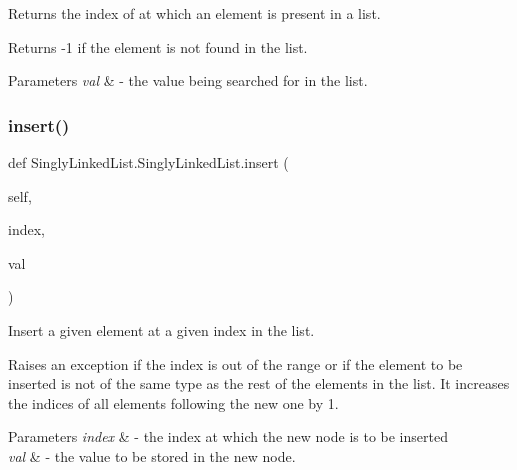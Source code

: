 Returns the index of at which an element is present in a list. 

Returns -\/1 if the element is not found in the list.


\begin{DoxyParams}{Parameters}
{\em val} & -\/ the value being searched for in the list. \\
\hline
\end{DoxyParams}
\mbox{\label{class_singly_linked_list_1_1_singly_linked_list_a9b220c861a6a494377b660e7d8939fd6}} 
\subsubsection{\texorpdfstring{insert()}{insert()}}
{\footnotesize\ttfamily def Singly\+Linked\+List.\+Singly\+Linked\+List.\+insert (\begin{DoxyParamCaption}\item[{}]{self,  }\item[{}]{index,  }\item[{}]{val }\end{DoxyParamCaption})}



Insert a given element at a given index in the list. 

Raises an exception if the index is out of the range or if the element to be inserted is not of the same type as the rest of the elements in the list. It increases the indices of all elements following the new one by 1.


\begin{DoxyParams}{Parameters}
{\em index} & -\/ the index at which the new node is to be inserted \\
\hline
{\em val} & -\/ the value to be stored in the new node. \\
\hline
\end{DoxyParams}
\mbox{\label{class_singly_linked_list_1_1_singly_linked_list_a8ce39ad9c69786d36b9c25e0bf4efe4d}} 
